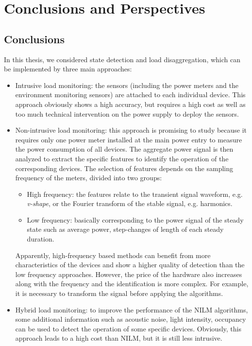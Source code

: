 
\chapter{Conclusions and Perspectives} %
\label{Conclusion}

\section{Conclusions}
In this thesis, we considered state detection and load disaggregation, which can be implemented by three main approaches:
\begin{itemize}
\item Intrusive load monitoring: the sensors (including the power meters and the environment monitoring sensors) are attached to each individual device. This approach obviously shows a high accuracy, but requires a high cost as well as too much technical intervention on the power supply to deploy the sensors.
\item Non-intrusive load monitoring: this approach is promising to study because it requires only one power meter installed at the main power entry to measure the power consumption of all devices. The aggregate power signal is then analyzed to extract the specific features to identify the operation of the corresponding devices. The selection of features depends on the sampling frequency of the meters, divided into two groups:
\begin{itemize}
\item High frequency: the features relate to the transient signal waveform, e.g. \textit{v-shape}, or the Fourier transform of the stable signal, e.g. harmonics.
\item Low frequency: basically corresponding to the power signal of the steady state such as average power, step-changes of length of each steady duration.
\end{itemize}
Apparently, high-frequency based methods can benefit from more characteristics of the devices and show a higher quality of detection than the low frequency approaches. However, the price of the hardware also increases along with the frequency and the identification is more complex. For example, it is necessary to transform the signal before applying the algorithms.
\item Hybrid load monitoring: to improve the performance of the NILM algorithms, some additional information such as acoustic noise, light intensity, occupancy can be used to detect the operation of some specific devices. Obviously, this approach leads to a high cost than NILM, but it is still less intrusive.
\end{itemize}

